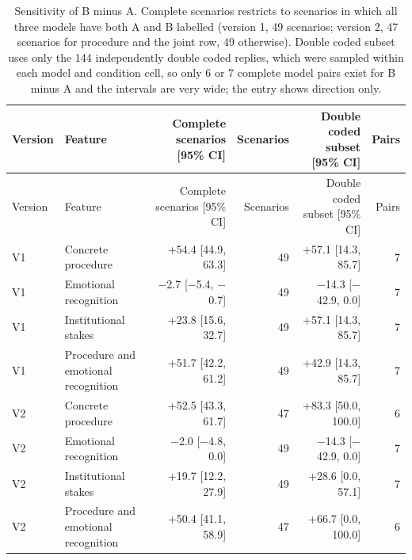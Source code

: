 \begin{longtable}{@{}llrrrr@{}}
\caption{Sensitivity of B minus A. Complete scenarios restricts to scenarios in which all three models have both A and B labelled (version 1, 49 scenarios; version 2, 47 scenarios for procedure and the joint row, 49 otherwise). Double coded subset uses only the 144 independently double coded replies, which were sampled within each model and condition cell, so only 6 or 7 complete model pairs exist for B minus A and the intervals are very wide; the entry shows direction only.}\label{tab:sensitivity}\\
\toprule Version & Feature & Complete scenarios [95\% CI] & Scenarios & Double coded subset [95\% CI] & Pairs \\ \midrule \endfirsthead
\toprule Version & Feature & Complete scenarios [95\% CI] & Scenarios & Double coded subset [95\% CI] & Pairs \\ \midrule \endhead
\bottomrule \endfoot
V1 & Concrete procedure & +54.4 [44.9, 63.3] & 49 & +57.1 [14.3, 85.7] & 7 \\
V1 & Emotional recognition & $-$2.7 [$-$5.4, $-$0.7] & 49 & $-$14.3 [$-$42.9, 0.0] & 7 \\
V1 & Institutional stakes & +23.8 [15.6, 32.7] & 49 & +57.1 [14.3, 85.7] & 7 \\
V1 & Procedure and emotional recognition & +51.7 [42.2, 61.2] & 49 & +42.9 [14.3, 85.7] & 7 \\
V2 & Concrete procedure & +52.5 [43.3, 61.7] & 47 & +83.3 [50.0, 100.0] & 6 \\
V2 & Emotional recognition & $-$2.0 [$-$4.8, 0.0] & 49 & $-$14.3 [$-$42.9, 0.0] & 7 \\
V2 & Institutional stakes & +19.7 [12.2, 27.9] & 49 & +28.6 [0.0, 57.1] & 7 \\
V2 & Procedure and emotional recognition & +50.4 [41.1, 58.9] & 47 & +66.7 [0.0, 100.0] & 6 \\
\end{longtable}

